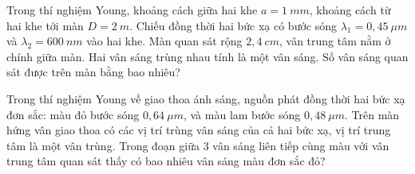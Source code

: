 \begin{ex}
Trong thí nghiệm Young, khoảng cách giữa hai khe $a=1\ mm$, khoảng cách từ hai khe tới màn $D=2\ m$. Chiếu đồng thời hai bức xạ có bước sóng $\lambda_1=0,45\ \mu m$ và $\lambda_2=600\ nm$ vào hai khe. Màn quan sát rộng $2,4\ cm$, vân trung tâm nằm ở chính giữa màn. Hai vân sáng trùng nhau tính là một vân sáng. Số vân sáng quan sát được trên màn bằng bao nhiêu?
\end{ex}
\begin{ex}
Trong thí nghiệm Young về giao thoa ánh sáng, nguồn phát đồng thời hai bức xạ đơn sắc: màu đỏ bước sóng $0,64\  \mu m$, và màu lam bước sóng $0,48\  \mu m$. Trên màn hứng vân giao thoa có các vị trí trùng vân sáng của cả hai bức xạ, vị trí trung tâm là một vân trùng. Trong đoạn giữa 3 vân sáng liên tiếp cùng màu với vân trung tâm quan sát thấy có bao nhiêu vân sáng màu đơn sắc đỏ?
\end{ex}

